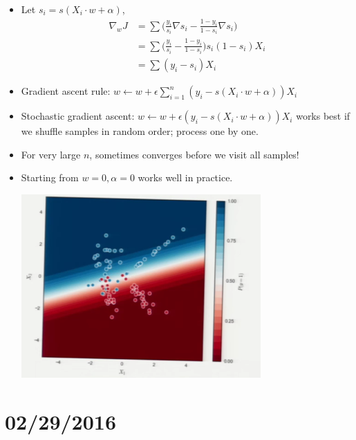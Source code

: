 \documentclass[10pt]{article}
\begin{document}
\begin{itemize}
\begin{center}
			\end{center}
			\item Let $s_{i} = s(X_{i}\cdot w + \alpha)$,
			\begin{align*}
				\nabla_{w} J &= \sum\Big(\frac{y_{i}}{s_{i}}\nabla s_{i} - \frac{1-y_{i}}{1 - s_{i}} \nabla s_{i}\Big)\\
					&= \sum \Big(\frac{y_{i}}{s_{i}} - \frac{1-y_{i}}{1 - s_{i}}\Big) s_{i} (1 - s_{i})X_{i}\\
					&= \sum (y_{i} - s_{i})X_{i}
			\end{align*}
			
			\item Gradient ascent rule: $w \leftarrow w + \epsilon \sum_{i=1}^{n}(y_{i} - s(X_{i}\cdot w + \alpha))X_{i}$
			\item Stochastic gradient ascent: $w \leftarrow w + \epsilon(y_{i} - s(X_{i}\cdot w + \alpha))X_{i}$ works best if we shuffle samples in random order; process one by one.
			\item For very large $n$, sometimes converges before we visit all samples!
			\item Starting from $w=0, \alpha=0$ works well in practice.
			\begin{center}
				\includegraphics[scale=0.5]{images/regression}
			\end{center}
		\end{itemize}


\newpage
\section*{02/29/2016}
\end{document}
